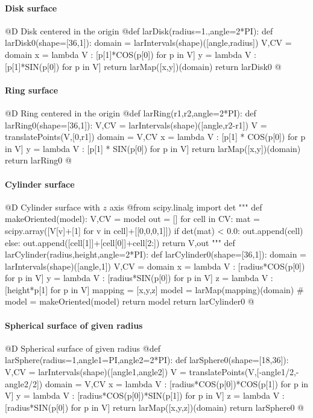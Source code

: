 \documentclass[11pt,oneside]{article}	%
\begin{document}
\paragraph{Disk surface}
@D Disk centered in the origin
@{def larDisk(radius=1.,angle=2*PI):
	def larDisk0(shape=[36,1]):
		domain = larIntervals(shape)([angle,radius])
		V,CV = domain
		x = lambda V : [p[1]*COS(p[0]) for p in V]
		y = lambda V : [p[1]*SIN(p[0]) for p in V]
		return larMap([x,y])(domain)
	return larDisk0
@}

\paragraph{Ring surface}
@D Ring centered in the origin
@{def larRing(r1,r2,angle=2*PI):
	def larRing0(shape=[36,1]):
		V,CV = larIntervals(shape)([angle,r2-r1])
		V = translatePoints(V,[0,r1])
		domain = V,CV
		x = lambda V : [p[1] * COS(p[0]) for p in V]
		y = lambda V : [p[1] * SIN(p[0]) for p in V]
		return larMap([x,y])(domain)
	return larRing0
@}
\paragraph{Cylinder surface}
@D Cylinder surface with $z$ axis
@{from scipy.linalg import det
"""
def makeOriented(model):
	V,CV = model
	out = []
	for cell in CV: 
		mat = scipy.array([V[v]+[1] for v in cell]+[[0,0,0,1]])
		if det(mat) < 0.0:
			out.append(cell)
		else:
			out.append([cell[1]]+[cell[0]]+cell[2:])
	return V,out
"""
def larCylinder(radius,height,angle=2*PI):
	def larCylinder0(shape=[36,1]):
		domain = larIntervals(shape)([angle,1])
		V,CV = domain
		x = lambda V : [radius*COS(p[0]) for p in V]
		y = lambda V : [radius*SIN(p[0]) for p in V]
		z = lambda V : [height*p[1] for p in V]
		mapping = [x,y,z]
		model = larMap(mapping)(domain)
		# model = makeOriented(model)
		return model
	return larCylinder0
@}
\paragraph{Spherical surface of given radius}
@D Spherical surface of given radius
@{def larSphere(radius=1,angle1=PI,angle2=2*PI):
	def larSphere0(shape=[18,36]):
		V,CV = larIntervals(shape)([angle1,angle2])
		V = translatePoints(V,[-angle1/2,-angle2/2])
		domain = V,CV
		x = lambda V : [radius*COS(p[0])*COS(p[1]) for p in V]
		y = lambda V : [radius*COS(p[0])*SIN(p[1]) for p in V]
		z = lambda V : [radius*SIN(p[0]) for p in V]
		return larMap([x,y,z])(domain)
	return larSphere0
@}
\end{document}

